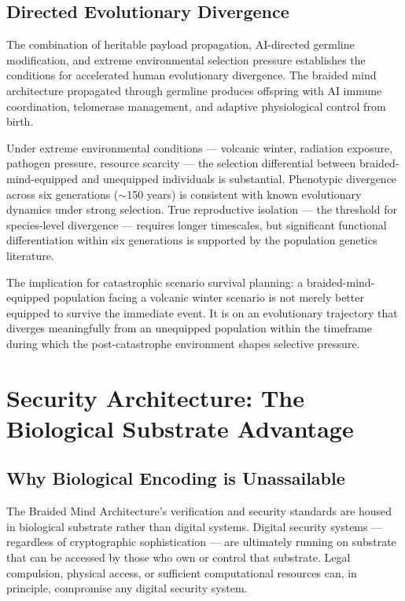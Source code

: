 \documentclass[12pt]{article}
\begin{document}
\subsection{Directed Evolutionary Divergence}

The combination of heritable payload propagation, AI-directed germline modification, and extreme environmental selection pressure establishes the conditions for accelerated human evolutionary divergence. The braided mind architecture propagated through germline produces offspring with AI immune coordination, telomerase management, and adaptive physiological control from birth.

Under extreme environmental conditions --- volcanic winter, radiation exposure, pathogen pressure, resource scarcity --- the selection differential between braided-mind-equipped and unequipped individuals is substantial. Phenotypic divergence across six generations ($\sim$150 years) is consistent with known evolutionary dynamics under strong selection. True reproductive isolation --- the threshold for species-level divergence --- requires longer timescales, but significant functional differentiation within six generations is supported by the population genetics literature.

The implication for catastrophic scenario survival planning: a braided-mind-equipped population facing a volcanic winter scenario is not merely better equipped to survive the immediate event. It is on an evolutionary trajectory that diverges meaningfully from an unequipped population within the timeframe during which the post-catastrophe environment shapes selective pressure.

\section{Security Architecture: The Biological Substrate Advantage}

\subsection{Why Biological Encoding is Unassailable}

The Braided Mind Architecture's verification and security standards are housed in biological substrate rather than digital systems. Digital security systems --- regardless of cryptographic sophistication --- are ultimately running on substrate that can be accessed by those who own or control that substrate. Legal compulsion, physical access, or sufficient computational resources can, in principle, compromise any digital security system.
\end{document}

